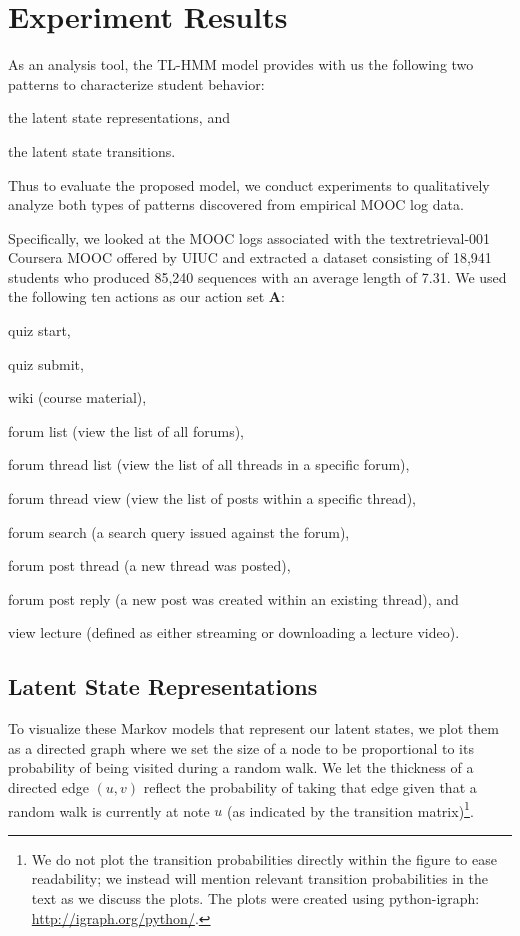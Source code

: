 \newcommand{\textretrieval}{textretrieval-001}

\newcommand{\sustain}{sustain-001}

\newcommand{\UIUC}{UIUC}

\section{Experiment Results}
As an analysis tool, the TL-HMM model provides with us the following two
patterns to characterize student behavior:
\begin{enumerate*}[label=(\arabic*)]
  \item the latent state representations, and
  \item the latent state transitions.
\end{enumerate*}
Thus to evaluate the proposed model, we conduct experiments to
qualitatively analyze both types of patterns discovered from empirical MOOC
log data.

Specifically, we looked at the MOOC logs associated with the \textretrieval{}
Coursera MOOC offered by \UIUC{} and extracted a dataset consisting of
18,941 students who produced 85,240 sequences with an average length of
7.31. We used the following ten actions as our action set $\mathbf{A}$:
\begin{enumerate*}[label=(\arabic*)]
  \item quiz start,
  \item quiz submit,
  \item wiki (course material),
  \item forum list (view the list of all forums),
  \item forum thread list (view the list of all threads in a specific
    forum),
  \item forum thread view (view the list of posts within a specific
    thread),
  \item forum search (a search query issued against the forum),
  \item forum post thread (a new thread was posted),
  \item forum post reply (a new post was created within an existing
    thread), and
  \item view lecture (defined as either streaming or downloading a lecture
    video).
\end{enumerate*}

\subsection{Latent State Representations}
To visualize these Markov models that represent our latent states, we plot
them as a directed graph where we set the size of a node to be proportional
to its probability of being visited during a random walk.  We let the
thickness of a directed edge $(u, v)$ reflect the probability of taking
that edge given that a random walk is currently at note $u$ (as indicated
by the transition matrix)\footnote{We do not plot the transition
probabilities directly within the figure to ease readability; we instead
will mention relevant transition probabilities in the text as we discuss
the plots. The plots were created using python-igraph:
\url{http://igraph.org/python/}.}.

